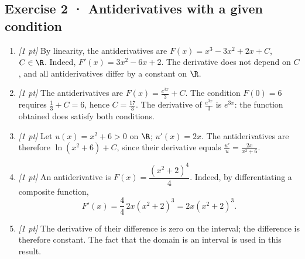 \subsection*{Exercise 2 · Antiderivatives with a given condition}\begin{enumerate}

\item \textit{[1 pt]} By linearity, the antiderivatives are $F(x)=x^3-3x^2+2x+C$, $C\in\R$. Indeed, $F'(x)=3x^2-6x+2$. The derivative does not depend on $C$, and all antiderivatives differ by a constant on $\R$.

\item \textit{[1 pt]} The antiderivatives are $F(x)=\frac{e^{3x}}{3}+C$. The condition $F(0)=6$ requires $\frac{1}{3}+C=6$, hence $C=\frac{17}{3}$. The derivative of $\frac{e^{3x}}{3}$ is $e^{3x}$: the function obtained does satisfy both conditions.

\item \textit{[1 pt]} Let $u(x)=x^2+6>0$ on $\R$; $u'(x)=2x$. The antiderivatives are therefore $\ln(x^2+6)+C$, since their derivative equals $\frac{u'}{u}=\frac{2x}{x^2+6}$.

\item \textit{[1 pt]} An antiderivative is $F(x)=\dfrac{(x^2+2)^{4}}{4}$. Indeed, by differentiating a composite function,
\[F'(x)=\frac{4}{4}\,2x(x^2+2)^{3}=2x(x^2+2)^{3}.\]

\item \textit{[1 pt]} The derivative of their difference is zero on the interval; the difference is therefore constant. The fact that the domain is an interval is used in this result.

\end{enumerate}

